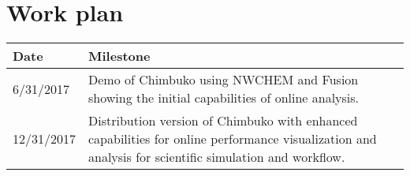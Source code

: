 \section{Work plan}

\begin{tabular}{|p{0.7in}|p{5.5in}|}\hline
\textbf{Date}  & \textbf{Milestone} \\\hline
6/31/2017 &  Demo of Chimbuko using NWCHEM and Fusion showing the initial capabilities of online analysis.\\\hline
12/31/2017 & Distribution version of Chimbuko with enhanced capabilities for online performance visualization and analysis for scientific simulation and workflow. \\\hline

\end{tabular}
